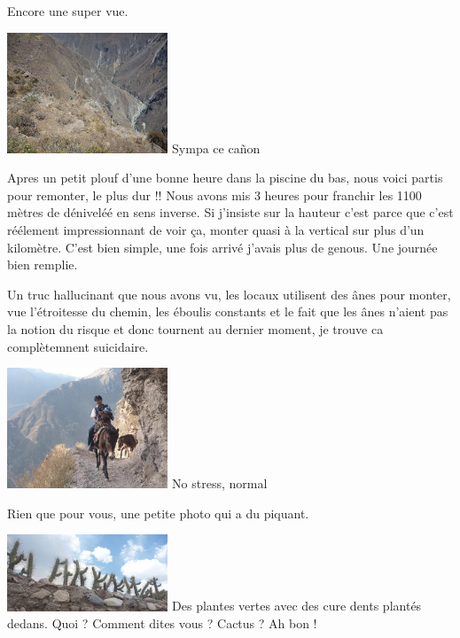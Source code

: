 \begin{multicols}{2}
Encore une super vue.

\hspace*{-0.65cm}
\includegraphics[width=4.8cm]{articles/Arequipa-colca-titicaca/1256607348QGMH.jpg}
Sympa ce cañon

Apres un petit plouf d'une bonne heure dans la piscine du bas, nous voici partis pour remonter, le plus dur !! Nous avons mis 3 heures pour franchir les 1100 mètres de déniveléé en sens inverse. Si j'insiste sur la hauteur c'est parce que c'est réélement impressionnant de voir ça, monter quasi à la vertical sur plus d'un kilomètre. C'est bien simple, une fois arrivé j'avais plus de genous. Une journée bien remplie.

Un truc hallucinant que nous avons vu, les locaux utilisent des ânes pour monter, vue l'étroitesse du chemin, les éboulis constants et le fait que les ânes n'aient pas la notion du risque et donc tournent au dernier moment, je trouve ca complètemnent suicidaire.

\hspace*{-0.65cm}
\includegraphics[width=4.8cm]{articles/Arequipa-colca-titicaca/1256607366kAzy.jpg}
No stress, normal

Rien que pour vous, une petite photo qui a du piquant.

\hspace*{-0.65cm}
\includegraphics[width=4.8cm]{articles/Arequipa-colca-titicaca/1256607370Azvi.jpg}
Des plantes vertes avec des cure dents plantés dedans. Quoi ? Comment dites vous ? Cactus ? Ah bon !


\end{multicols}
